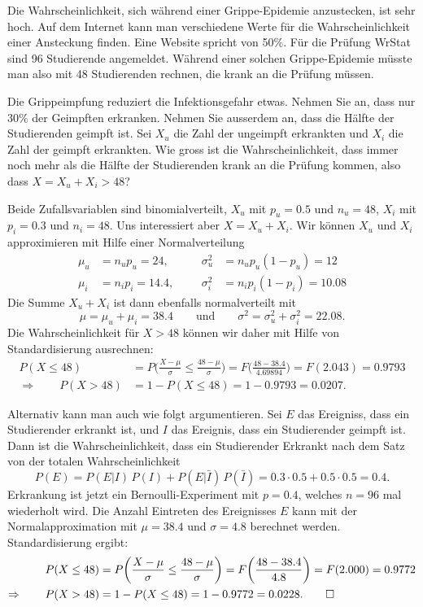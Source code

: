 Die Wahrscheinlichkeit, sich während einer Grippe-Epidemie anzustecken,
ist sehr hoch.
Auf dem Internet kann man verschiedene Werte für die Wahrscheinlichkeit
einer Ansteckung finden.
Eine Website spricht von 50\%.
Für die Prüfung WrStat sind 96 Studierende angemeldet.
Während einer solchen Grippe-Epidemie müsste man also mit 48 Studierenden
rechnen, die krank an die Prüfung müssen.

Die Grippeimpfung reduziert die Infektionsgefahr etwas.
Nehmen Sie an, dass nur 30\% der Geimpften erkranken.
Nehmen Sie ausserdem an, dass die Hälfte der Studierenden geimpft ist.
Sei $X_u$ die Zahl der ungeimpft erkrankten und $X_i$ die Zahl der geimpft
erkrankten.
Wie gross ist die Wahrscheinlichkeit, dass immer noch
mehr als die Hälfte der Studierenden krank an die Prüfung kommen, also
dass $X=X_u+X_i>48$?


\begin{loesung}
Beide Zufallsvariablen sind binomialverteilt, $X_u$ mit $p_u=0.5$ und $n_u=48$,
$X_i$ mit $p_i=0.3$ und $n_i=48$.
Uns interessiert aber $X=X_u+X_i$.
Wir können $X_u$ und $X_i$ approximieren mit Hilfe einer Normalverteilung
\[
\begin{aligned}
\mu_u&=n_up_u=24,  &&&\sigma_u^2&=n_up_u(1-p_u)=12 \\
\mu_i&=n_ip_i=14.4, &&&\sigma_i^2&=n_ip_i(1-p_i)=10.08
\end{aligned}
\]
Die Summe $X_u+X_i$ ist dann ebenfalls normalverteilt mit 
\[
\mu=\mu_u + \mu_i = 38.4
\qquad\text{und}\qquad
\sigma^2 = \sigma_u^2 + \sigma_i^2 = 22.08.
\]
Die Wahrscheinlichkeit für $X>48$ können wir daher mit Hilfe von
Standardisierung ausrechnen:
\begin{align*}
P(X\le 48)
&=
P\biggl(
\frac{X-\mu}{\sigma}
\le
\frac{48 - \mu}{\sigma}
\biggr)
=
F\biggl(
\frac{48-38.4}{4.69894}
\biggr)
=
F(2.043)
=
0.9793
\\
\Rightarrow
\qquad
P(X>48)
&=
1-P(X\le 48)
=
1-0.9793=0.0207.
\end{align*}

Alternativ kann man auch wie folgt argumentieren.
Sei $E$ das Ereigniss, dass ein Studierender erkrankt ist, und $I$
das Ereignis, dass ein Studierender geimpft ist.
Dann ist die Wahrscheinlichkeit, dass ein Studierender Erkrankt nach dem
Satz von der totalen Wahrscheinlichkeit
\[
P(E)
=
P(E|I)\,P(I)
+
P(E|\bar I)\,P(\bar I)
=
0.3\cdot0.5 + 0.5\cdot 0.5
=
0.4.
\]
Erkrankung ist jetzt ein Bernoulli-Experiment mit $p=0.4$, welches $n=96$ mal
wiederholt wird.
Die Anzahl Eintreten des Ereignisses $E$ kann mit der Normalapproximation
mit $\mu=38.4$ und $\sigma=4.8$ berechnet werden.
Standardisierung ergibt:
\begin{align*}
P(X\le 48)
&=
P\biggl(\frac{X-\mu}{\sigma}\le \frac{48-\mu}{\sigma}\biggr)
=
F\biggl(\frac{48-38.4}{4.8}\biggr)
=
F(2.000)
=
0.9772
\\
\Rightarrow
\qquad
P(X>48)
&=1-P(X\le 48)=1-0.9772 = 0.0228.
\qedhere
\end{align*}
\end{loesung}

